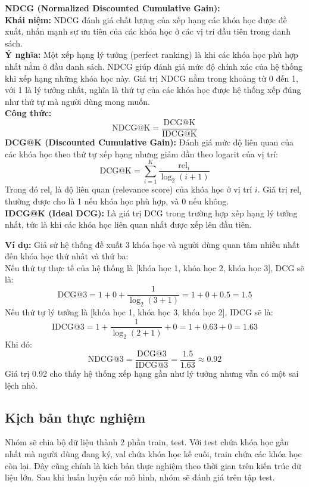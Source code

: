 \textbf{NDCG (Normalized Discounted Cumulative Gain):} \\
\textbf{Khái niệm:} NDCG đánh giá chất lượng của xếp hạng các khóa học được đề xuất, nhấn mạnh sự ưu tiên của các khóa học ở các vị trí đầu tiên trong danh sách. \\
\textbf{Ý nghĩa:} Một xếp hạng lý tưởng (perfect ranking) là khi các khóa học phù hợp nhất nằm ở đầu danh sách. NDCG giúp đánh giá mức độ chính xác của hệ thống khi xếp hạng những khóa học này. Giá trị NDCG nằm trong khoảng từ 0 đến 1, với 1 là lý tưởng nhất, nghĩa là thứ tự của các khóa học được hệ thống xếp đúng như thứ tự mà người dùng mong muốn. \\

\textbf{Công thức:}
\[
\text{NDCG@K} = \frac{\text{DCG@K}}{\text{IDCG@K}}
\]
\textbf{DCG@K (Discounted Cumulative Gain):} Đánh giá mức độ liên quan của các khóa học theo thứ tự xếp hạng nhưng giảm dần theo logarit của vị trí:
\[
\text{DCG@K} = \sum_{i=1}^{K} \frac{\text{rel}_i}{\log_2(i+1)}
\]
Trong đó $\text{rel}_i$ là độ liên quan (relevance score) của khóa học ở vị trí $i$. Giá trị $\text{rel}_i$ thường được cho là 1 nếu khóa học phù hợp, và 0 nếu không. \\

\textbf{IDCG@K (Ideal DCG):} Là giá trị DCG trong trường hợp xếp hạng lý tưởng nhất, tức là khi các khóa học liên quan nhất được xếp lên đầu tiên.

\textbf{Ví dụ:} Giả sử hệ thống đề xuất 3 khóa học và người dùng quan tâm nhiều nhất đến khóa học thứ nhất và thứ ba: \\
Nếu thứ tự thực tế của hệ thống là [khóa học 1, khóa học 2, khóa học 3], DCG sẽ là:
\[
\text{DCG@3} = 1 + 0 + \frac{1}{\log_2(3+1)} = 1 + 0 + 0.5 = 1.5
\]
Nếu thứ tự lý tưởng là [khóa học 1, khóa học 3, khóa học 2], IDCG sẽ là:
\[
\text{IDCG@3} = 1 + \frac{1}{\log_2(2+1)} + 0 = 1 + 0.63 + 0 = 1.63
\]
Khi đó:
\[
\text{NDCG@3} = \frac{\text{DCG@3}}{\text{IDCG@3}} = \frac{1.5}{1.63} \approx 0.92
\]
Giá trị 0.92 cho thấy hệ thống xếp hạng gần như lý tưởng nhưng vẫn có một sai lệch nhỏ.




\subsection{Kịch bản thực nghiệm}
Nhóm sẽ chia bộ dữ liệu thành 2 phần train, test. Với test chứa khóa học gần nhất mà người dùng đang ký, val chứa khóa học kế cuối, train chứa các khóa học còn lại. Đây cũng chính là kich bản thực nghiệm theo thời gian trên kiến trúc dữ liệu lớn. Sau khi huấn luyện các mô hình, nhóm sẽ đánh giá trên tập test.
